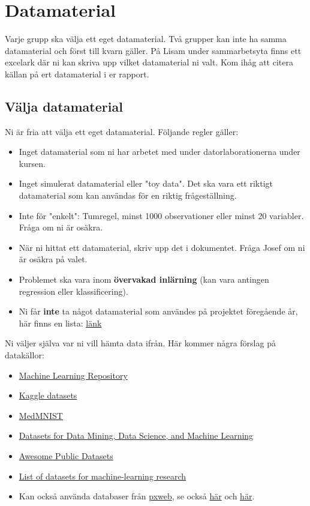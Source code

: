 \documentclass[a4paper]{article}
\begin{document}
\section{Datamaterial} \label{sec:data}
Varje grupp ska välja ett eget datamaterial. Två grupper kan inte ha samma datamaterial och först till kvarn gäller. På Lisam under sammarbetsyta finns ett excelark där ni kan skriva upp vilket datamaterial ni valt. Kom ihåg att citera källan på ert datamaterial i er rapport.

\subsection*{Välja datamaterial}
Ni är fria att välja ett eget datamaterial. Följande regler gäller:
\begin{itemize}
    \item Inget datamaterial som ni har arbetet med under datorlaborationerna under kursen.
    \item Inget simulerat datamaterial eller "toy data". Det ska vara ett riktigt datamaterial som kan användas för en riktig frågeställning.
    \item Inte för "enkelt": Tumregel, minst 1000 observationer eller minst 20 variabler. Fråga om ni är osäkra.
    \item När ni hittat ett datamaterial, skriv upp det i dokumentet. Fråga Josef om ni är osäkra på valet.
    \item Problemet ska vara inom \textbf{övervakad inlärning} (kan vara antingen regression eller klassificering).
    \item Ni får \textbf{inte} ta något datamaterial som användes på projektet föregående år, här finns en lista: \href{https://liuonline.sharepoint.com/:x:/r/sites/Lisam_732G57_2025HT_O2/CourseDocuments/datamaterial_projeket_2024.xlsx?d=wd84cf1abe387489aa32aa4cb91f34cca&csf=1&web=1&e=Xmv8rr}{länk}
\end{itemize}
Ni väljer själva var ni vill hämta data ifrån. Här kommer några förslag på datakällor:
\begin{itemize}
    \item \href{https://archive.ics.uci.edu/ml/index.php}{Machine Learning Repository}
    \item \href{https://www.kaggle.com/datasets}{Kaggle datasets}
    \item \href{https://medmnist.com/}{MedMNIST}
    \item \href{https://www.kdnuggets.com/datasets/index.html}{Datasets for Data Mining, Data Science, and Machine Learning}
    \item \href{https://github.com/awesomedata/awesome-public-datasets}{Awesome Public Datasets}
    \item \href{https://en.wikipedia.org/wiki/List_of_datasets_for_machine-learning_research}{List of datasets for machine-learning research}
    \item Kan också använda databaser från \href{https://cran.r-project.org/web/packages/pxweb/index.html}{pxweb}, se också \href{https://cran.r-project.org/web/packages/pxweb/vignettes/pxweb.html}{här} och \href{https://www.scb.se/en/services/statistical-programs-for-px-files/px-web/pxweb-examples/}{här}.
\end{itemize}
\end{document}
